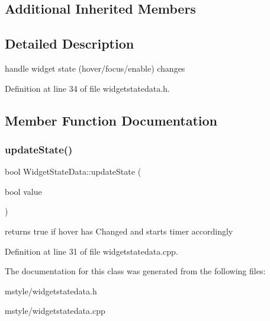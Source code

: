 \subsection*{Additional Inherited Members}


\subsection{Detailed Description}
handle widget state (hover/focus/enable) changes 

Definition at line 34 of file widgetstatedata.\+h.



\subsection{Member Function Documentation}
\mbox{\label{class_widget_state_data_a32e87d0152a3d9f522e5fbe10c2813b3}} 
\subsubsection{\texorpdfstring{update\+State()}{updateState()}}
{\footnotesize\ttfamily bool Widget\+State\+Data\+::update\+State (\begin{DoxyParamCaption}\item[{bool}]{value }\end{DoxyParamCaption})\hspace{0.3cm}{\ttfamily [virtual]}}

returns true if hover has Changed and starts timer accordingly 

Definition at line 31 of file widgetstatedata.\+cpp.



The documentation for this class was generated from the following files\+:\begin{DoxyCompactItemize}
\item 
mstyle/widgetstatedata.\+h\item 
mstyle/widgetstatedata.\+cpp\end{DoxyCompactItemize}
